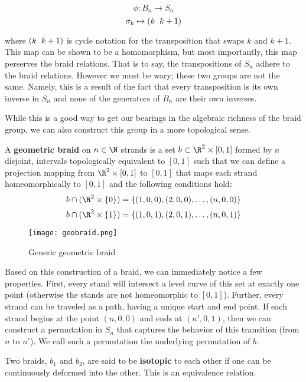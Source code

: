 $$\phi:B_n\rightarrow S_n$$
$$\sigma_k \mapsto (k \hspace{2mm} k+1)$$

\noindent where $(k \hspace{2mm}k+1)$ is cycle notation for the transposition that swaps $k$ and $k+1$. This map can be shown to be a homomorphism, but most importantly, this map perserves the braid relations. That is to say, the transpositions of $S_n$ adhere to the braid relations. However we must be wary; these two groups are not the same. Namely, this is a result of the fact that every transposition is its own inverse in $S_n$ and none of the generators of $B_n$ are their own inverses. 

While this is a good way to get our bearings in the algebraic richness of the braid group, we can also construct this group in a more topological sense.

\begin{definition}
	A \textbf{geometric braid} on $n\in \N$ strands is a set $b\subset\R^2\times [0,1]$ formed by $n$ disjoint, intervals topologically equivalent to $[0,1]$ such that we can define a projection mapping from $\R^2\times [0,1]$ to $[0,1]$ that maps each strand homeomorphically to $[0,1]$ and the following conditions hold:
$$b\cap(\R^2\times\{0\}) = \{(1,0,0),(2,0,0),\hdots,(n,0,0)\}$$
$$b\cap(\R^2\times\{1\}) = \{(1,0,1),(2,0,1),\hdots,(n,0,1)\}$$
\end{definition}

\begin{figure}[H]
	\centering
	\texttt{[image: geobraid.png]}
	\caption{Generic geometric braid}
\end{figure}

Based on this construction of a braid, we can immediately notice a few properties. First, every stand will intersect a level curve of this set at exactly one point (otherwise the stands are not homeomorphic to $[0,1]$). Further, every strand can be traveled as a path, having a unique start and end point. If each strand begins at the point $(n,0,0)$ and ends at $(n',0,1)$, then we can construct a permutation in $S_n$ that captures the behavior of this transition (from $n$ to $n'$). We call such a permutation the underlying permutation of $b$.

\begin{definition}
	Two braids, $b_1$ and $b_2$, are said to be \textbf{isotopic} to each other if one can be continuously deformed into the other. This is an equivalence relation.
\end{definition}

